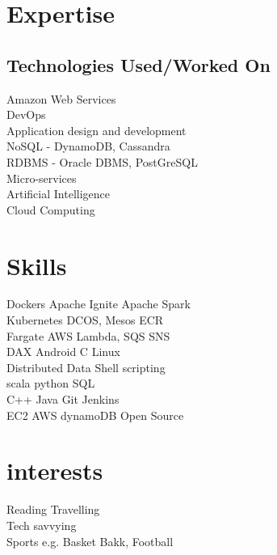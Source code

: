 \documentclass[]{deedy-resume-openfont}
\begin{document}
\begin{minipage}[t]{0.33\textwidth}
\section{Expertise}
\subsection{Technologies Used/Worked On}
Amazon Web Services \\
DevOps\\
Application design and development\\
NoSQL - DynamoDB, Cassandra \\
RDBMS - Oracle DBMS, PostGreSQL \\
Micro-services \\
Artificial Intelligence \\
Cloud Computing

\sectionsep


\section{Skills}
\textbullet{} Dockers \textbullet{} Apache Ignite \textbullet{} Apache Spark \\
\textbullet{} Kubernetes \textbullet{} DCOS, Mesos \textbullet{}  ECR\\
\textbullet{} Fargate \textbullet{} AWS Lambda, SQS \textbullet{} SNS \\
\textbullet{} DAX \textbullet{} Android \textbullet{} C \textbullet{} Linux \\
\textbullet{} Distributed Data \textbullet{} Shell scripting \\
\textbullet{} scala \textbullet{} python \textbullet{} SQL \\ 
\textbullet{} C++ \textbullet{} Java \textbullet{} Git \textbullet{} Jenkins\\
\textbullet{} EC2 \textbullet{} AWS dynamoDB \textbullet{} Open Source 
\sectionsep


\section{interests} 

\textbullet{} Reading \textbullet{} Travelling \\
\textbullet{} Tech savvying\\
\textbullet{} Sports e.g. Basket Bakk, Football\\
\sectionsep


%
%

\end{minipage} 
\end{document}
